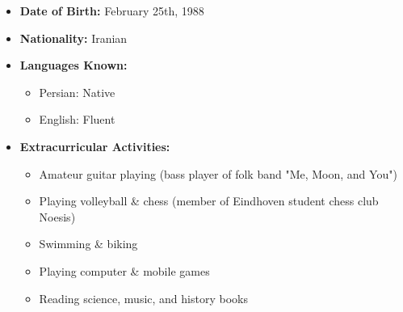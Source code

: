 \documentclass{cv}
\begin{document}
\begin{itemize}

\item
\textbf{Date of Birth:}
February 25th, 1988


\item
{\bf Nationality:}
Iranian

\item
\textbf{Languages Known:}
\begin{itemize}

\item
Persian: Native

\item
English: Fluent
%
\end{itemize}

\item
\textbf{Extracurricular Activities:}

\begin{itemize}
\item
Amateur guitar playing (bass player of folk band "Me, Moon, and You")
\item
Playing volleyball \& chess (member of Eindhoven student chess club  Noesis)
\item
Swimming \& biking
\item
Playing computer \& mobile games
\item
Reading science, music, and history books
\end{itemize} 


\end{itemize}

\end{document}

